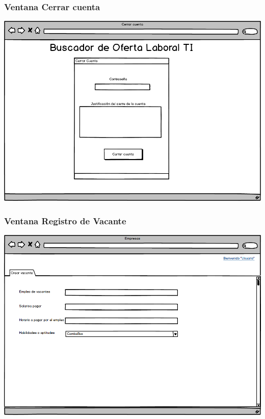 \frame
{
  \frametitle{  Ventana Cerrar cuenta}
  \begin{center}
		\includegraphics[scale=0.28]{./resources/09cerrarcuenta.png}
  \end{center}
}


\frame
{
  \frametitle{  Ventana Registro de Vacante}
  \begin{center}
		\includegraphics[scale=0.28]{./resources/13revacante.png}
  \end{center}
}


